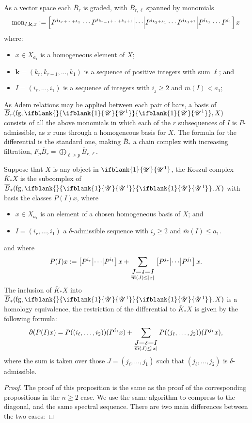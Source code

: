 \documentclass[10pt]{article}
\makeatletter
\newcommand{\nontop}[1]{\ifblank{#1}{\scrU}{\scrU^{#1}}}
\newcommand{\produces}[3]{{#1}{#3}{#2}}
\newcommand{\forget}{\mathrm{fg}}
\newcommand{\Fr}[2][]{\ifblank{#1}{#2}{#2_{#1}}}
\newcommand{\minDimP}{\overline{m}}
\newcommand{\BarMonomial}[3]{\textup{mon}_{#1,#2,#3}}
\renewcommand{\produces}[3]{
{
\def\labelstyle{\scriptstyle}
\xymatrix@C=2em@1{
{#1}
\ar@{-}[r]|-{{\,#3\,}}
&%
{#2}%
}}}
\makeatother
\begin{document}
\begin{KoszulComplexes1}
\begin{prop}
As a vector space each $\overline{B}_r$ is graded, with $\overline{B}_{r,\ell}$
spanned by monomials
\[\BarMonomial{I}{\textbf{k}}{x}:=\left[P^{i_{k_r+\cdots +k_1}}\cdots P^{i_{k_{r-1}+\cdots +k_1+1}}
\middle|\cdots 
\middle|P^{i_{k_2+k_1}}\cdots P^{i_{k_1+1}}
\middle|P^{i_{k_1}}\cdots P^{i_1}\right]
x\]
where:
\begin{itemize}
\setlength{\parindent}{.25in}
\item $x\in X_{a_1}$ is a homogeneous element of $X$;
\item $\textbf{k}=(k_r,k_{r-1},\ldots,k_{1})$ is a sequence of positive integers with sum $\ell$; and
\item $I=(i_\ell,\ldots,i_1)$ is a sequence of integers with $i_j\geq2$ and $\minDimP(I)<a_1$;
\end{itemize}
As Adem relations may be applied between each pair of bars, a basis of $\overline{B}_r(\forget,\Fr{\nontop{1}},X)$ consists of all the above monomials in which each of the $r$ subsequences of $I$ is $P$-admissible, as $x$ runs through a homogeneous basis for $X$. The formula for the differential is the standard one, making %
 $\overline{B}_*$ a chain complex with increasing filtration, $F_p\overline{B}_r=\bigoplus_{\ell\geq p}\overline{B}_{r,\ell}$. 
\end{prop}


\begin{prop}
Suppose that $X$ is any object in $\nontop{1}$, the Koszul complex $\overline{K}_*X$ is the subcomplex of $\overline{B}_*(\forget,\Fr{\nontop{1}},X)$ with basis the classes $P(I)x$, where 
\begin{itemize}
\setlength{\parindent}{.25in}
\item $x\in X_{a_1}$ is an element of a chosen homogeneous basis of $X$;  and
\item $I=(i_r,\ldots,i_1)$ a $\delta$-admissible sequence with $i_j\geq2$ and $\minDimP(I)\leq a_1$.
\end{itemize}
and where 
\[P(I)x:=\left[P^{i_r} \middle|\cdots\middle|P^{i_1} \right]x+\sum_{\substack{\produces{J}{I}{\delta} \\ \minDimP(J)\leq|x|}}\left[P^{j_r} \middle|\cdots\middle|P^{j_1} \right]x.\]
The inclusion of $\overline{K}_*X$ into $\overline{B}_*(\forget,\Fr{\nontop{1}},X)$ is a homology equivalence, the restriction of the differential to $\overline{K}_*X$ is given by the following formula:
\[\partial(P(I)x)=P((i_{\ell},\ldots,i_2))(P^{i_1}x)+\sum_{\substack{\produces{J}{I}{\delta} \\ \minDimP(J)\leq|x|}} P((j_{\ell},\ldots,j_2))(P^{j_1}x),\]
where the sum is taken over those $J=(j_{\ell},\ldots,j_1)$ such that $(j_{\ell},\ldots,j_2)$ is $\delta$-admissible.
\end{prop}
\begin{proof}
The proof of this proposition is the same as the proof of the corresponding propositions in the $n\geq2$ case. We use the same algorithm to compress to the diagonal, and the same spectral sequence. There are two main differences between the two cases:


\end{proof}
\end{KoszulComplexes1}
\end{document}
